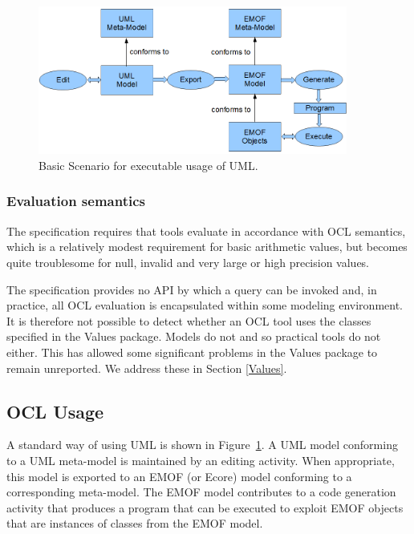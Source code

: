 \documentclass{eceasst}
\begin{document}
\begin{figure}
  \begin{center}
    \includegraphics[width=4.0in]{BasicScenario.png}
  \end{center}
  \caption{Basic Scenario for executable usage of UML.}
  \label{fig:BasicScenario}
\end{figure}

\subsubsection{Evaluation semantics}

The specification requires that tools evaluate in accordance with OCL semantics, which is a relatively modest requirement for basic arithmetic values, but becomes quite troublesome for null, invalid and very large or high precision values.

The specification provides no API by which a query can be invoked and, in practice, all OCL evaluation is encapsulated within some modeling environment. It is therefore not possible to detect whether an OCL tool uses the classes specified in the Values package. Models do not and so practical tools do not either. This has allowed some significant problems in the Values package to remain unreported. We address these in Section \ref{Values}.
 
\subsection{OCL Usage}

A standard way of using UML is shown in Figure~\ref{fig:BasicScenario}. A UML model conforming to a UML meta-model is maintained by an editing activity. When appropriate, this model is exported to an EMOF (or Ecore) model conforming to a corresponding meta-model. The EMOF model contributes to a code generation activity that produces a program that can be executed to exploit EMOF objects that are instances of classes from the EMOF model.
\end{document}
